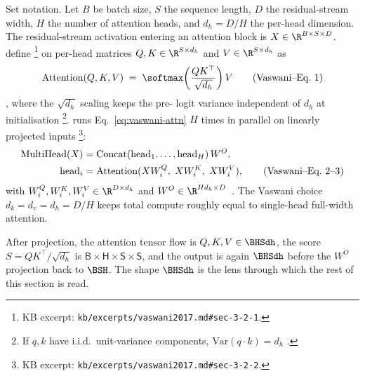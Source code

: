 Set notation. Let $B$ be batch size, $S$ the sequence length, $D$
the residual-stream width, $H$ the number of attention heads, and
$d_h = D / H$ the per-head dimension. The residual-stream activation
entering an attention block is $X \in \R^{B \times S \times D}$.
\citet{vaswani2017} define %
\footnote{KB excerpt: \nolinkurl{kb/excerpts/vaswani2017.md#sec-3-2-1}.}
on per-head matrices $Q, K \in \R^{S \times d_h}$ and
$V \in \R^{S \times d_h}$ as
\begin{equation}
  \mathrm{Attention}(Q, K, V) \;=\;
  \softmax\!\left(\frac{Q K^\top}{\sqrt{d_h}}\right) V
  \tag{Vaswani--Eq.~1}
  \label{eq:vaswani-attn}
\end{equation}
\citep[\S 3.2.1, Eq.~1]{vaswani2017}, where the $\sqrt{d_h}$ scaling
keeps the pre- logit variance independent of $d_h$ at
initialisation%
\footnote{If $q, k$ have i.i.d.\ unit-variance components,
$\mathrm{Var}(q\!\cdot\!k) = d_h$ \citep[\S 3.2.1, fn.~4]{vaswani2017}.}.
 runs Eq.~\eqref{eq:vaswani-attn} $H$ times in
parallel on linearly projected inputs%
\footnote{KB excerpt: \nolinkurl{kb/excerpts/vaswani2017.md#sec-3-2-2}.}:
\begin{align}
  \mathrm{MultiHead}(X)
   &= \mathrm{Concat}(\mathrm{head}_1, \ldots, \mathrm{head}_H)\,W^O,
   \notag \\
  \mathrm{head}_i
   &= \mathrm{Attention}(X W_i^Q,\; X W_i^K,\; X W_i^V),
  \tag{Vaswani--Eq.~2--3}
  \label{eq:vaswani-mh}
\end{align}
with $W_i^Q, W_i^K, W_i^V \in \R^{D \times d_h}$ and
$W^O \in \R^{H d_h \times D}$~\citep[\S 3.2.2, Eq.~2--3]{vaswani2017}.
The Vaswani choice $d_k = d_v = d_h = D/H$ keeps total compute roughly
equal to single-head full-width attention.

After projection, the attention tensor flow is
$Q, K, V \in \BHSdh$, the score $S = QK^\top/\sqrt{d_h}$ is
$\mathsf{B}\!\times\!\mathsf{H}\!\times\!\mathsf{S}\!\times\!\mathsf{S}$,
and the output is again $\BHSdh$ before the $W^O$ projection back to
$\BSH$. The shape $\BHSdh$ is the lens through which the rest of this
section is read.

